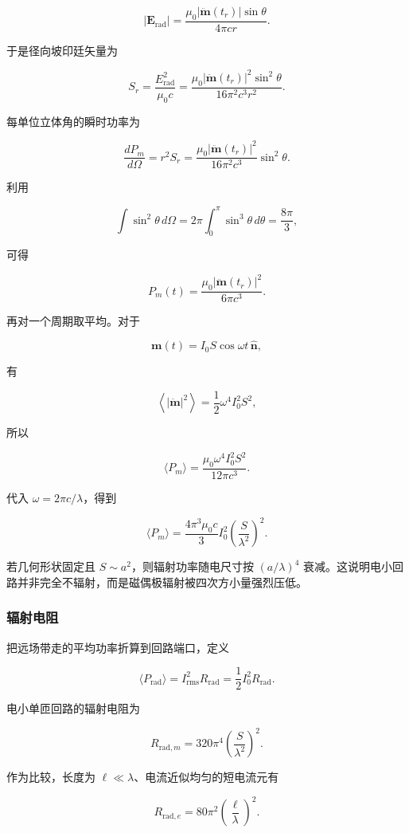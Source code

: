 \[
|\mathbf E_{\mathrm{rad}}|
=\frac{\mu_0|\ddot{\mathbf m}(t_r)|\sin\theta}{4\pi cr}.
\]

于是径向坡印廷矢量为

\[
S_r
=\frac{E_{\mathrm{rad}}^2}{\mu_0c}
=\frac{\mu_0|\ddot{\mathbf m}(t_r)|^2\sin^2\theta}
{16\pi^2c^3r^2}.
\]

每单位立体角的瞬时功率为

\[
\frac{dP_m}{d\Omega}
=r^2S_r
=\frac{\mu_0|\ddot{\mathbf m}(t_r)|^2}{16\pi^2c^3}
\sin^2\theta.
\]

利用

\[
\int\sin^2\theta\,d\Omega
=2\pi\int_0^{\pi}\sin^3\theta\,d\theta
=\frac{8\pi}{3},
\]

可得

\[
P_m(t)=\frac{\mu_0|\ddot{\mathbf m}(t_r)|^2}{6\pi c^3}.
\]

再对一个周期取平均。对于

\[
\mathbf m(t)=I_0S\cos\omega t\,\hat{\mathbf n},
\]

有

\[
\left\langle|\ddot{\mathbf m}|^2\right\rangle
=\frac12\omega^4I_0^2S^2,
\]

所以

\[
\langle P_m\rangle
=\frac{\mu_0\omega^4I_0^2S^2}{12\pi c^3}.
\]

代入 \(\omega=2\pi c/\lambda\)，得到

\[
\boxed{
\langle P_m\rangle
=\frac{4\pi^3\mu_0c}{3}I_0^2
\left(\frac{S}{\lambda^2}\right)^2}.
\]

若几何形状固定且 \(S\sim a^2\)，则辐射功率随电尺寸按 \((a/\lambda)^4\)
衰减。这说明电小回路并非完全不辐射，而是磁偶极辐射被四次方小量强烈压低。

\subsubsection{辐射电阻}\label{m7:ux8f90ux5c04ux7535ux963b}

把远场带走的平均功率折算到回路端口，定义

\[
\langle P_{\mathrm{rad}}\rangle
=I_{\mathrm{rms}}^2R_{\mathrm{rad}}
=\frac12I_0^2R_{\mathrm{rad}}.
\]

电小单匝回路的辐射电阻为

\[
\boxed{
R_{\mathrm{rad},m}
=320\pi^4\left(\frac{S}{\lambda^2}\right)^2}.
\]

作为比较，长度为 \(\ell\ll\lambda\)、电流近似均匀的短电流元有

\[
R_{\mathrm{rad},e}
=80\pi^2\left(\frac{\ell}{\lambda}\right)^2.
\]


